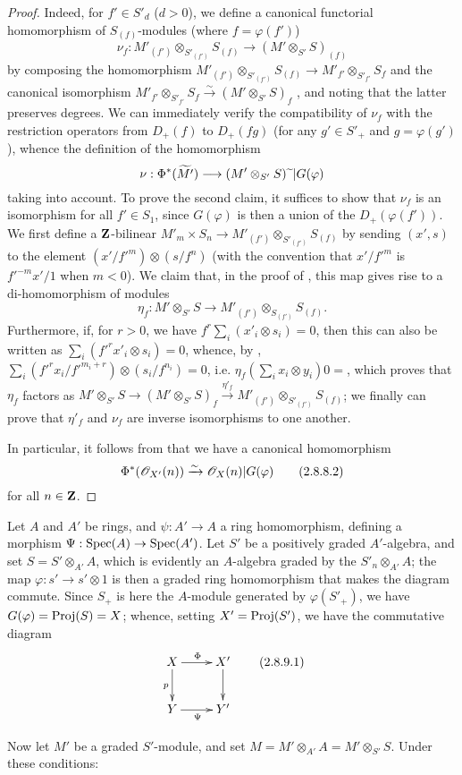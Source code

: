 \begin{proof}
Indeed, for $f'\in S'_d$ ($d>0$), we define a canonical functorial homomorphism of $S_{(f)}$-modules (where $f=\varphi(f')$)
\[
\label{II.2.8.8.1}
  \nu_f: M'_{(f')}\otimes_{S'_{(f')}}S_{(f)} \to (M'\otimes_{S'}S)_{(f)}
\tag{2.8.8.1}
\]
by composing the homomorphism $M'_{(f')}\otimes_{S'_{(f')}}S_{(f)}\to M'_{f'}\otimes_{S'_{f'}}S_f$ and the canonical isomorphism $M'_{f'}\otimes_{S'_{f'}}S_f\xrightarrow{\sim}(M'\otimes_{S'}S)_f$ , and noting that the latter preserves degrees.
We can immediately verify the compatibility of $\nu_f$ with the restriction operators from $D_+(f)$ to $D_+(fg)$ (for any $g'\in S'_+$ and $g=\varphi(g')$), whence the definition of the homomorphism
\[
  \nu: \Phi^*(\widetilde{M'}) \to (M'\otimes_{S'}S)\supertilde|G(\varphi)
\]
taking  into account.
To prove the second claim, it suffices to show that $\nu_f$ is an isomorphism for all $f'\in S_1$, since $G(\varphi)$ is then a union of the $D_+(\varphi(f'))$.
We first define a $\mathbf{Z}$-bilinear $M'_m\times S_n\to M'_{(f')}\otimes_{S'_{(f')}}S_{(f)}$ by sending $(x',s)$ to the element $(x'/{f'}^m)\otimes(s/f^n)$ (with the convention that $x'/{f'}^m$ is ${f'}^{-m}x'/1$ when $m<0$).
We claim that, in the proof of , this map gives rise to a di-homomorphism of modules
\[
  \eta_f: M'\otimes_{S'}S \to M'_{(f')}\otimes_{S_{(f')}}S_{(f)}.
\]
Furthermore, if, for $r>0$, we have $f^r\sum_i(x'_i\otimes s_i)=0$, then this can also be written as $\sum_i({f'}^rx'_i\otimes s_i)=0$, whence, by , $\sum_i({f'}^rx_i/{f'}^{m_i+r})\otimes(s_i/f^{n_i})=0$, i.e. $\eta_f(\sum_i x_i\otimes y_i)0=$, which proves that $\eta_f$ factors as $M'\otimes_{S'}S\to(M'\otimes_{S'}S)_f\xrightarrow{\eta'_f}M'_{(f')}\otimes_{S'_{(f')}}S_{(f)}$;
we finally can prove that $\eta'_f$ and $\nu_f$ are inverse isomorphisms to one another.

In particular, it follows from  that we have a canonical homomorphism
\[
\label{II.2.8.8.2}
  \Phi^*(\mathscr{O}_{X'}(n)) \xrightarrow{\sim} \mathscr{O}_X(n)|G(\varphi)
\tag{2.8.8.2}
\]
for all $n\in\mathbf{Z}$.
\end{proof}

\begin{env}[2.8.9]
\label{II.2.8.9}
Let $A$ and $A'$ be rings, and $\psi:A'\to A$ a ring homomorphism, defining a morphism $\Psi:\Spec(A)\to\Spec(A')$.
Let $S'$ be a positively graded $A'$-algebra, and set $S=S'\otimes_{A'}A$, which is evidently an $A$-algebra graded by the $S'_n\otimes_{A'}A$;
the map $\varphi:s'\to s'\otimes1$ is then a graded ring homomorphism that makes the diagram  commute.
Since $S_+$ is here the $A$-module generated by $\varphi(S'_+)$, we have $G(\varphi)=\operatorname{Proj}(S)=X$;
whence, setting $X'=\operatorname{Proj}(S')$, we have the commutative diagram
\[
\label{II.2.8.9.1}
  \xymatrix{
    X \ar[r]^{\Phi} \ar[d]_p
    & X' \ar[d]
  \\Y \ar[r]_{\Psi}
    & Y'
  }
\tag{2.8.9.1}
\]

Now let $M'$ be a graded $S'$-module, and set $M=M'\otimes_{A'}A=M'\otimes_{S'}S$.
Under these conditions:
\end{env}


